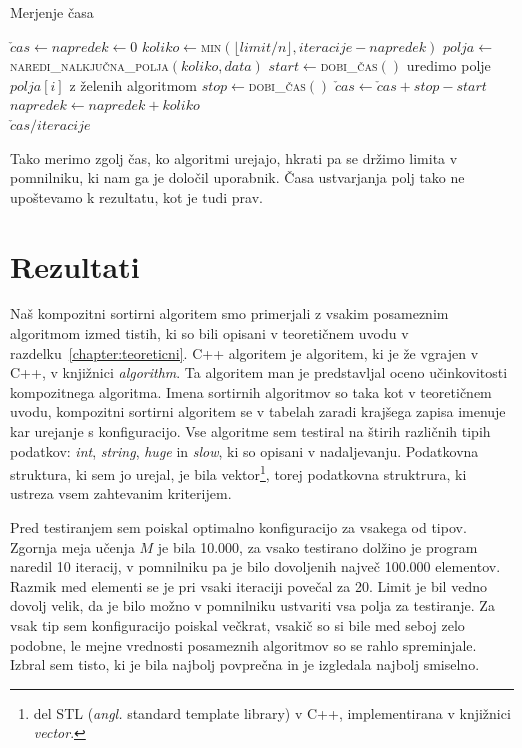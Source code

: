 \documentclass[a4paper,oneside,12pt]{article}
\begin{document}
\begin{algorithm}[h!t!]
  \caption{Merjenje časa}\label{algo:time}
  \begin{algorithmic}[1]
    \State \label{line:init} $\check{c}as \gets napredek \gets 0$
    \Repeat \label{line:repeattimestart}
      \State \label{line:koliko} $koliko \gets $\textsc{min}$(\lfloor limit / n \rfloor, iteracije - napredek)$
      \State \label{line:polja} $polja \gets $\textsc{naredi\_nalkjučna\_polja}$(koliko, data)$
      \State \label{line:getstarttime} $start \gets $\textsc{dobi\_čas}$()$
       \label{line:beginsortfor}
        \State uredimo polje $polja[i]$ z želenih algoritmom
      \EndFor \label{line:endsortfor}
      \State \label{line:getendtime} $stop \gets $\textsc{dobi\_čas}$()$
      \State $\check{c}as \gets \check{c}as + stop - start$
      \State $napredek \gets napredek + koliko$
     \label{line:repeattimeend} \\
    \Return \label{line:returnaverage}$\check{c}as / iteracije$
  \end{algorithmic}
\end{algorithm}
Tako merimo zgolj čas, ko algoritmi urejajo, hkrati pa se držimo limita v pomnilniku, ki
nam ga je določil uporabnik. Časa ustvarjanja polj tako ne upoštevamo k rezultatu, kot
je tudi prav.


\section{Rezultati}
Naš kompozitni sortirni algoritem smo primerjali z vsakim posameznim algoritmom izmed
tistih, ki so bili opisani v teoretičnem uvodu v razdelku~\ref{chapter:teoreticni}. C++ algoritem
je algoritem, ki je že vgrajen v C++, v knjižnici \emph{algorithm}. Ta algoritem
man je predstavljal oceno učinkovitosti kompozitnega algoritma.
Imena sortirnih algoritmov so taka kot v teoretičnem uvodu, kompozitni sortirni algoritem se v tabelah 
zaradi krajšega zapisa imenuje kar urejanje s konfiguracijo.
Vse algoritme sem testiral na štirih različnih tipih podatkov: 
\emph{int}, \emph{string}, \emph{huge} in \emph{slow}, ki so opisani v nadaljevanju.
Podatkovna struktura, ki sem jo urejal, je bila vektor\footnote{del STL
(\emph{angl.} standard template library) v C++,
implementirana v knjižnici \emph{vector}.}, torej podatkovna struktrura, ki
ustreza vsem zahtevanim kriterijem.

Pred testiranjem sem poiskal optimalno konfiguracijo za vsakega od tipov. Zgornja meja
učenja $M$ je bila 10.000, za vsako testirano dolžino je program naredil 10 iteracij, v pomnilniku
pa je bilo dovoljenih največ 100.000 elementov. Razmik med elementi se je pri vsaki iteraciji povečal za 20.
Limit je bil vedno dovolj velik, da je bilo možno v pomnilniku ustvariti vsa
polja za testiranje. Za vsak tip sem konfiguracijo poiskal večkrat, vsakič so si
bile med seboj zelo podobne, le mejne vrednosti posameznih algoritmov so se
rahlo spreminjale. Izbral sem tisto, ki je bila najbolj povprečna in je
izgledala najbolj smiselno.
\end{document}
